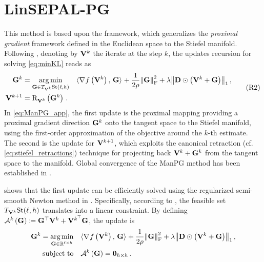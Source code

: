 \section{LinSEPAL-PG}\label{app:ManPG}
This method is based upon the   framework, which generalizes the \emph{proximal gradient} framework defined in the Euclidean space to the Stiefel manifold.
Following , denoting by $\mathbf{V}^k$ the iterate at the step $k$, the updates recursion for solving \eqref{eq:minKL} reads as
\begin{equation}\label{eq:ManPG_app}
    \begin{aligned}
        \mathbf{G}^k &= \operatorname*{arg\,min}_{\mathbf{G} \in T_{\mathbf{V}^k}{\mathrm{St}({\ell},{h})}} \quad \langle \nabla_{} f\left(\mathbf{V}^k\right), \, \mathbf{G} \rangle_{} + \frac{1}{2\rho} \norm{\mathbf{G}}_{\mathrm{F}}^2 + \lambda \norm{\mathbf{D} \odot \left(\mathbf{V}^k + \mathbf{G}\right)}_1 \, ,\\
        \mathbf{V}^{k+1} &= \mathrm{R}^{}_{\mathbf{V}^k}\left( \mathbf{G}^k \right) \,.
    \end{aligned}
    \tag{R2}
\end{equation}
In \eqref{eq:ManPG_app}, the first update is the proximal mapping providing a proximal gradient direction $\mathbf{G}^k$ onto the tangent space to the Stiefel manifold, using the first-order approximation of the objective around the $k$-th estimate.
The second is the update for $\mathbf{V}^{k+1}$, which exploits the canonical retraction (cf. \cref{eq:stiefel_retractions}) technique for projecting back $\mathbf{V}^k + \mathbf{G}^k$ from the tangent space to the manifold.
Global convergence of the ManPG method has been established in .

\citet{chen2020} shows that the first update can be efficiently solved using the regularized semi-smooth Newton method in .
Specifically, according to , the feasible set $T_{\mathbf{V}^k}{\mathrm{St}({\ell},{h})}$ translates into a linear constraint.
By defining ${\mathcal{A}^k}\left({\mathbf{G}}\right) \coloneqq \mathbf{G}^\top \mathbf{V}^k + \mathbf{V}^{k^\top} \mathbf{G}$, the update is
\begin{equation}\label{eq:ManPGU1}
    \begin{aligned}
        \mathbf{G}^k = \operatorname*{arg\,min}_{\mathbf{G} \in \mathbb{R}^{\ell \times h}} &\quad \langle \nabla_{} f\left(\mathbf{V}^k\right), \, \mathbf{G} \rangle_{} + \frac{1}{2\rho} \norm{\mathbf{G}}_{\mathrm{F}}^2 + \lambda \norm{\mathbf{D} \odot \left(\mathbf{V}^k + \mathbf{G}\right)}_1 \, ,\\
        \textrm{subject to} &\quad {\mathcal{A}^k}\left({\mathbf{G}}\right) = \boldsymbol{0}_{h \times h}\,.
    \end{aligned}
\end{equation}

